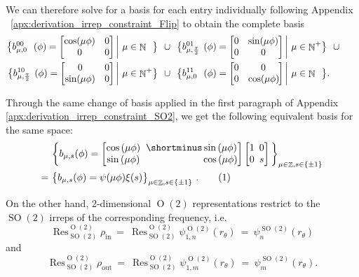 \documentclass{article}
\newcommand{\apx}{Appendix\xspace
}
\newcommand{\lp}{\left(}
\newcommand{\rp}{\right)}
\DeclareMathOperator*{\Z}{\mathbb{Z}}
\DeclareMathOperator*{\N}{\mathbb{N}}
\renewcommand{\O}[1]{\ensuremath{\operatorname{O}(#1)}}
\newcommand{\SO}[1]{\ensuremath{\operatorname{SO}(#1)}}
\newcommand{\Res}[2]{\ensuremath{\operatorname{Res}_{#1}^{#2}}}
\newcommand{\PSI}[1]{
	\begin{bmatrix}
		\cos\lp#1\rp & \!\!\!         \shortminus \sin\lp#1\rp \\
		\sin\lp#1\rp & \!\!\!\phantom{\shortminus}\cos\lp#1\rp \\
	\end{bmatrix}
}
\newcommand{\XI}[1]{
	\begin{bmatrix}
		1 & \!\!\! 0 \\
		0 & \!\!\! #1 \\
	\end{bmatrix}
}
\begin{document}
We can therefore solve for a basis for each entry individually following \apx~\ref{apx:derivation_irrep_constraint_Flip} to obtain the complete basis
\begin{align*}
	\big\{b^{00}_{\mu,0\phantom{{\pi\over2}}}(\phi) = \begin{bmatrix} \cos(\mu\phi) & 0 \\ 0 & 0 \end{bmatrix}  \bigg|\ \mu \in {\N}^{\phantom{+}} \big\} \ \ \cup \ \ &           
	\big\{b^{01}_{\mu,{\pi\over2}\phantom{0}}(\phi) = \begin{bmatrix} 0 & \sin(\mu\phi) \\ 0 & 0 \end{bmatrix}  \bigg|\ \mu \in {\N}^+ \big\} \ \ \cup \ \ & \\
	\big\{b^{10}_{\mu,{\pi\over2}\phantom{0}}(\phi) = \begin{bmatrix} 0 & 0 \\ \sin(\mu\phi) & 0 \end{bmatrix}  \bigg|\ \mu \in {\N}^+ \big\} \ \ \cup \ \ &           
	\big\{b^{11}_{\mu,0\phantom{{\pi\over2}}}(\phi) = \begin{bmatrix} 0 & 0 \\ 0 & \cos(\mu\phi)\hspace*{-1pt} \end{bmatrix}  \bigg|\ \mu \in {\N}^{\phantom{+}} \big\}. \ \ \phantom{\cup} \ \ &
\end{align*}


Through the same change of basis applied in the first paragraph of \apx \ref{apx:derivation_irrep_constraint_SO2}, we get the following equivalent basis for the same space:
\begin{align*}
	   &\bigg\{b_{\mu,s}(\phi) = \PSI{\mu\phi}\XI{s} \bigg\}_{\mu \in \Z, s \in \{\pm 1\}} \\
	=\ &\big\{ b_{\mu,s}(\phi)  = \psi(\mu\phi)\xi(s) \big\}_{\mu \in \Z, s \in \{\pm 1\}}\ . \stepcounter{equation}\tag{\theequation}\label{eq:o2_2x2_starting_basis}
\end{align*}

On the other hand, 2-dimensional $\O2$ representations restrict to the $\SO2$ irreps of the corresponding frequency, i.e. 
\[
	\Res{\SO2}{\O2}\rho_\text{in}\ =\ \Res{\SO2}{\O2}\psi_{1,n}^{\O2}(r_\theta)\ =\ \psi_n^{\SO2}(r_\theta)
\]
and
\[
	\Res{\SO2}{\O2}\rho_\text{out}\ =\ \Res{\SO2}{\O2}\psi_{1,m}^{\O2}(r_\theta)\ =\ \psi_m^{\SO2}(r_\theta).
\]
\end{document}
